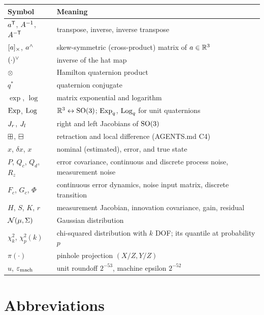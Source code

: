 \begin{center}\small
\begin{tabularx}{\textwidth}{@{}l X@{}}
\toprule
Symbol & Meaning \\
\midrule
$a^{\mathsf{T}}$, $A^{-1}$, $A^{-\mathsf{T}}$ & transpose, inverse, inverse transpose \\
$[a]_{\times}$, $a^{\wedge}$ & skew-symmetric (cross-product) matrix of $a\in\mathbb{R}^3$ \\
$(\cdot)^{\vee}$ & inverse of the hat map \\
$\otimes$ & Hamilton quaternion product \\
$q^*$ & quaternion conjugate \\
$\exp$, $\log$ & matrix exponential and logarithm \\
$\operatorname{Exp}$, $\operatorname{Log}$ & $\mathbb{R}^3\leftrightarrow\mathrm{SO}(3)$; $\operatorname{Exp}_q$, $\operatorname{Log}_q$ for unit quaternions \\
$J_r$, $J_l$ & right and left Jacobians of $\mathrm{SO}(3)$ \\
$\boxplus$, $\boxminus$ & retraction and local difference (AGENTS.md C4) \\
$\hat x$, $\delta x$, $x$ & nominal (estimated), error, and true state \\
$P$, $Q_c$, $Q_d$, $R_z$ & error covariance, continuous and discrete process noise, measurement noise \\
$F_c$, $G_c$, $\Phi$ & continuous error dynamics, noise input matrix, discrete transition \\
$H$, $S$, $K$, $r$ & measurement Jacobian, innovation covariance, gain, residual \\
$\mathcal{N}(\mu, \Sigma)$ & Gaussian distribution \\
$\chi^2_k$, $\chi^2_p(k)$ & chi-squared distribution with $k$ DOF; its quantile at probability $p$ \\
$\pi(\cdot)$ & pinhole projection $(X/Z, Y/Z)$ \\
$u$, $\varepsilon_{\mathrm{mach}}$ & unit roundoff $2^{-53}$, machine epsilon $2^{-52}$ \\
\bottomrule
\end{tabularx}
\end{center}

\section*{Abbreviations}

